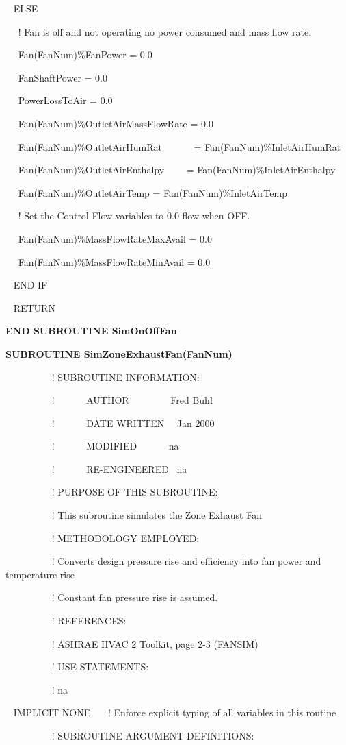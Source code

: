~ ELSE

~~ ! Fan is off and not operating no power consumed and mass flow rate.

~~ Fan(FanNum)\%FanPower = 0.0

~~ FanShaftPower = 0.0

~~ PowerLossToAir = 0.0

~~ Fan(FanNum)\%OutletAirMassFlowRate = 0.0

~~ Fan(FanNum)\%OutletAirHumRat~~~~~~ = Fan(FanNum)\%InletAirHumRat

~~ Fan(FanNum)\%OutletAirEnthalpy~~~~ = Fan(FanNum)\%InletAirEnthalpy

~~ Fan(FanNum)\%OutletAirTemp = Fan(FanNum)\%InletAirTemp

~~ ! Set the Control Flow variables to 0.0 flow when OFF.

~~ Fan(FanNum)\%MassFlowRateMaxAvail = 0.0

~~ Fan(FanNum)\%MassFlowRateMinAvail = 0.0

~ END IF

~ RETURN

\textbf{END SUBROUTINE SimOnOffFan}

\textbf{SUBROUTINE SimZoneExhaustFan(FanNum)}

~~~~~~~~~ ! SUBROUTINE INFORMATION:

~~~~~~~~~ !~~~~~~ AUTHOR~~~~~~~~ Fred Buhl

~~~~~~~~~ !~~~~~~ DATE WRITTEN~~ Jan 2000

~~~~~~~~~ !~~~~~~ MODIFIED~~~~~~ na

~~~~~~~~~ !~~~~~~ RE-ENGINEERED~ na

~~~~~~~~~ ! PURPOSE OF THIS SUBROUTINE:

~~~~~~~~~ ! This subroutine simulates the Zone Exhaust Fan

~~~~~~~~~ ! METHODOLOGY EMPLOYED:

~~~~~~~~~ ! Converts design pressure rise and efficiency into fan power and temperature rise

~~~~~~~~~ ! Constant fan pressure rise is assumed.

~~~~~~~~~ ! REFERENCES:

~~~~~~~~~ ! ASHRAE HVAC 2 Toolkit, page 2-3 (FANSIM)

~~~~~~~~~ ! USE STATEMENTS:

~~~~~~~~~ ! na

~ IMPLICIT NONE~~~ ! Enforce explicit typing of all variables in this routine

~~~~~~~~~ ! SUBROUTINE ARGUMENT DEFINITIONS:


